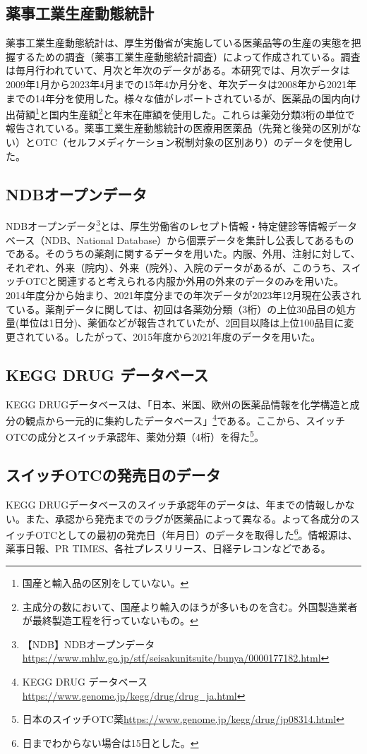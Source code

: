 \documentclass[a4paper,11pt,uplatex]{jsarticle}
\theoremstyle{definition}
\begin{document}
\subsection{薬事工業生産動態統計}
薬事工業生産動態統計は、厚生労働省が実施している医薬品等の生産の実態を把握するための調査（薬事工業生産動態統計調査）によって作成されている。調査は毎月行われていて、月次と年次のデータがある。本研究では、月次データは2009年1月から2023年4月までの15年4か月分を、年次データは2008年から2021年までの14年分を使用した。様々な値がレポートされているが、医薬品の国内向け出荷額\footnote{国産と輸入品の区別をしていない。}と国内生産額\footnote{主成分の数において、国産より輸入のほうが多いものを含む。外国製造業者が最終製造工程を行っていないもの。}と年末在庫額を使用した。これらは薬効分類3桁の単位で報告されている。薬事工業生産動態統計の医療用医薬品（先発と後発の区別がない）とOTC（セルフメディケーション税制対象の区別あり）のデータを使用した。
\subsection{NDBオープンデータ}
NDBオープンデータ\footnote{【NDB】NDBオープンデータ\url{https://www.mhlw.go.jp/stf/seisakunitsuite/bunya/0000177182.html}}とは、厚生労働省のレセプト情報・特定健診等情報データベース（NDB、National Database）から個票データを集計し公表してあるものである。そのうちの薬剤に関するデータを用いた。内服、外用、注射に対して、それぞれ、外来（院内）、外来（院外）、入院のデータがあるが、このうち、スイッチOTCと関連すると考えられる内服か外用の外来のデータのみを用いた。2014年度分から始まり、2021年度分までの年次データが2023年12月現在公表されている。薬剤データに関しては、初回は各薬効分類（3桁）の上位30品目の処方量(単位は1日分)、薬価などが報告されていたが、2回目以降は上位100品目に変更されている。したがって、2015年度から2021年度のデータを用いた。 
\subsection{KEGG DRUG データベース}
KEGG DRUGデータベースは、「日本、米国、欧州の医薬品情報を化学構造と成分の観点から一元的に集約したデータベース」\footnote{KEGG DRUG データベース\url{https://www.genome.jp/kegg/drug/drug_ja.html}}である。ここから、スイッチOTCの成分とスイッチ承認年、薬効分類（4桁）を得た\footnote{ 日本のスイッチOTC薬\url{https://www.genome.jp/kegg/drug/jp08314.html}}。
\subsection{スイッチOTCの発売日のデータ}
KEGG DRUGデータベースのスイッチ承認年のデータは、年までの情報しかない。また、承認から発売までのラグが医薬品によって異なる。よって各成分のスイッチOTCとしての最初の発売日（年月日）のデータを取得した\footnote{日までわからない場合は15日とした。}。情報源は、薬事日報、PR TIMES、各社プレスリリース、日経テレコンなどである。
\end{document}
